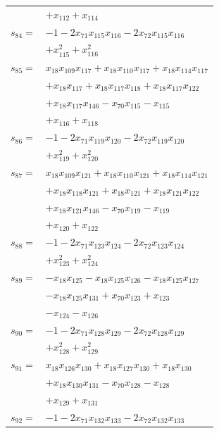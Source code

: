 \begin{longtable}{@{}r@{\;}l@{}}
 & \(\displaystyle +x_{112} +x_{114}\) \\[3pt]
\(s_{84}=\) & \(\displaystyle -1 -2x_{71}x_{115}x_{116} -2x_{72}x_{115}x_{116}\) \\
 & \(\displaystyle +x_{115}^{2} +x_{116}^{2}\) \\[3pt]
\(s_{85}=\) & \(\displaystyle x_{18}x_{109}x_{117} +x_{18}x_{110}x_{117} +x_{18}x_{114}x_{117}\) \\
 & \(\displaystyle +x_{18}x_{117} +x_{18}x_{117}x_{118} +x_{18}x_{117}x_{122}\) \\
 & \(\displaystyle +x_{18}x_{117}x_{146} -x_{70}x_{115} -x_{115}\) \\
 & \(\displaystyle +x_{116} +x_{118}\) \\[3pt]
\(s_{86}=\) & \(\displaystyle -1 -2x_{71}x_{119}x_{120} -2x_{72}x_{119}x_{120}\) \\
 & \(\displaystyle +x_{119}^{2} +x_{120}^{2}\) \\[3pt]
\(s_{87}=\) & \(\displaystyle x_{18}x_{109}x_{121} +x_{18}x_{110}x_{121} +x_{18}x_{114}x_{121}\) \\
 & \(\displaystyle +x_{18}x_{118}x_{121} +x_{18}x_{121} +x_{18}x_{121}x_{122}\) \\
 & \(\displaystyle +x_{18}x_{121}x_{146} -x_{70}x_{119} -x_{119}\) \\
 & \(\displaystyle +x_{120} +x_{122}\) \\[3pt]
\(s_{88}=\) & \(\displaystyle -1 -2x_{71}x_{123}x_{124} -2x_{72}x_{123}x_{124}\) \\
 & \(\displaystyle +x_{123}^{2} +x_{124}^{2}\) \\[3pt]
\(s_{89}=\) & \(\displaystyle -x_{18}x_{125} -x_{18}x_{125}x_{126} -x_{18}x_{125}x_{127}\) \\
 & \(\displaystyle -x_{18}x_{125}x_{131} +x_{70}x_{123} +x_{123}\) \\
 & \(\displaystyle -x_{124} -x_{126}\) \\[3pt]
\(s_{90}=\) & \(\displaystyle -1 -2x_{71}x_{128}x_{129} -2x_{72}x_{128}x_{129}\) \\
 & \(\displaystyle +x_{128}^{2} +x_{129}^{2}\) \\[3pt]
\(s_{91}=\) & \(\displaystyle x_{18}x_{126}x_{130} +x_{18}x_{127}x_{130} +x_{18}x_{130}\) \\
 & \(\displaystyle +x_{18}x_{130}x_{131} -x_{70}x_{128} -x_{128}\) \\
 & \(\displaystyle +x_{129} +x_{131}\) \\[3pt]
\(s_{92}=\) & \(\displaystyle -1 -2x_{71}x_{132}x_{133} -2x_{72}x_{132}x_{133}\) \\

\end{longtable}
